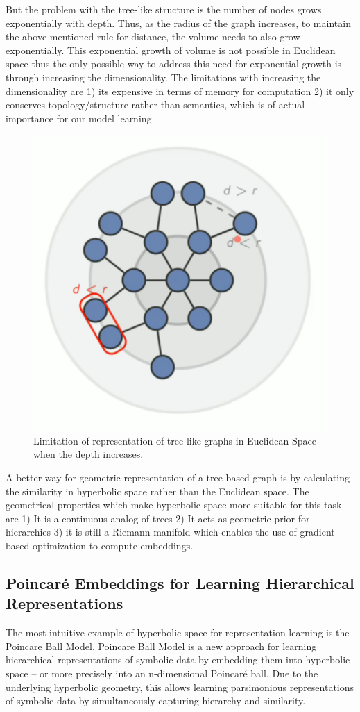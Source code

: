 But the problem with the tree-like structure is the number of nodes grows exponentially with depth. Thus, as the radius of the graph increases, to maintain the above-mentioned rule for distance, the volume needs to also grow exponentially. This exponential growth of volume is not possible in Euclidean space thus the only possible way to address this need for exponential growth is through increasing the dimensionality. The limitations with increasing the dimensionality are 1) its expensive in terms of memory for computation 2) it only conserves topology/structure rather than semantics, which is of actual importance for our model learning.
\begin{figure}
\centering
\includegraphics[width=0.5\linewidth]{lectures/11-a/tree_graphs_limitation.PNG}
\caption{Limitation of representation of tree-like graphs in Euclidean Space when the depth increases.}
\end{figure}


A better way for geometric representation of a tree-based graph is by calculating the similarity in hyperbolic space rather than the Euclidean space. The geometrical properties which make hyperbolic space more suitable for this task are 1) It is a continuous analog of trees 2) It acts as geometric prior for hierarchies 3) it is still a Riemann manifold which enables the use of gradient-based optimization to compute embeddings.

\subsection{Poincaré Embeddings for
Learning Hierarchical Representations}

The most intuitive example of hyperbolic space for representation learning is the Poincare Ball Model. Poincare Ball Model is a new approach for learning hierarchical representations of symbolic data by embedding them into hyperbolic space – or more precisely into an n-dimensional Poincaré ball. Due to the underlying hyperbolic geometry, this allows learning parsimonious representations of symbolic data by simultaneously capturing hierarchy and similarity.

